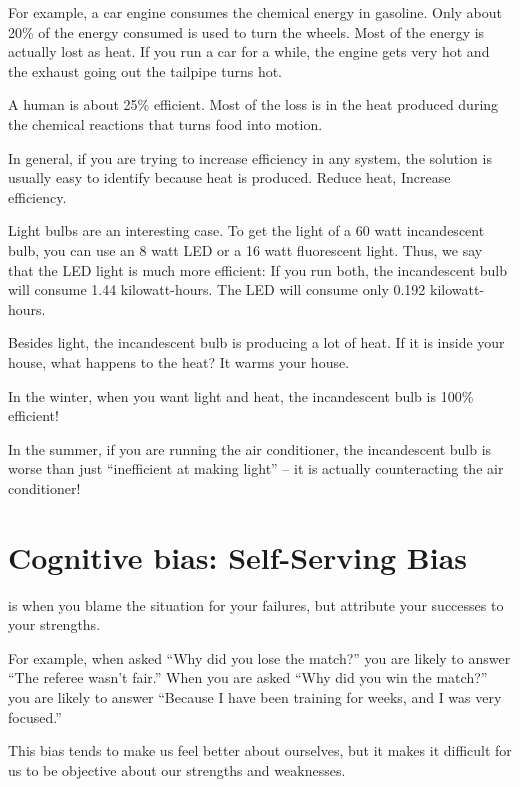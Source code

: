 For example, a car engine consumes the chemical energy in gasoline. Only
about 20\% of the energy consumed is used to turn the wheels.  Most of
the energy is actually lost as heat. If you run a car for a while, the engine
gets very hot and the exhaust going out the tailpipe turns hot.

A human is about 25\% efficient. Most of the loss is in the heat produced
during the chemical reactions that turns food into motion.
 
In general, if you are trying to increase efficiency in any system,
the solution is usually easy to identify because heat is produced. Reduce heat, Increase efficiency.

Light bulbs are an interesting case. To get the light of a 60 watt
incandescent bulb, you can use an 8 watt LED or a 16 watt fluorescent
light. Thus, we say that the LED light is much more efficient: If you
run both, the incandescent bulb will consume 1.44 kilowatt-hours. The
LED will consume only 0.192 kilowatt-hours.

Besides light, the incandescent bulb is producing a lot of heat. If it
is inside your house, what happens to the heat? It warms your house.

In the winter, when you want light and heat, the incandescent bulb is
100\% efficient!

In the summer, if you are running the air conditioner, the
incandescent bulb is worse than just ``inefficient at making light'' --
it is actually counteracting the air conditioner! 

\section{Cognitive bias: Self-Serving Bias}

 is when you blame the situation for your
failures, but attribute your successes to your strengths.

For example, when asked ``Why did you lose the match?'' you are likely
to answer ``The referee wasn't fair.''  When you are asked ``Why did
you win the match?'' you are likely to answer ``Because I have been
training for weeks, and I was very focused.''

This bias tends to make us feel better about ourselves, but it makes it
difficult for us to be objective about our strengths and weaknesses.

